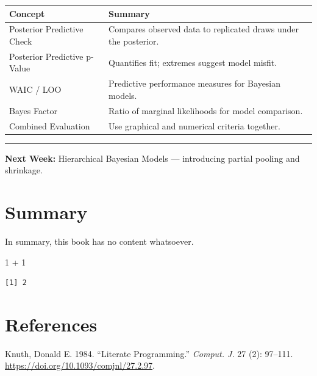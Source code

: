 \documentclass[
  letterpaper,
  DIV=11,
  numbers=noendperiod]{scrreprt}
\newenvironment{Shaded}{\begin{snugshade}}{\end{snugshade}}
\newcommand{\DecValTok}[1]{\textcolor[rgb]{0.68,0.00,0.00}{#1}}
\newcommand{\SpecialCharTok}[1]{\textcolor[rgb]{0.37,0.37,0.37}{#1}}
\newlength{\cslhangindent}
\newenvironment{CSLReferences}[2] %
 {\begin{list}{}{%
  \setlength{\itemindent}{0pt}
  \setlength{\leftmargin}{0pt}
  \setlength{\parsep}{0pt}
  \ifodd #1
   \setlength{\leftmargin}{\cslhangindent}
   \setlength{\itemindent}{-1\cslhangindent}
  \fi
  \setlength{\itemsep}{#2\baselineskip}}}
 {\end{list}}
\begin{document}
\begin{longtable}[]{@{}
  >{\raggedright\arraybackslash}p{}
  >{\raggedright\arraybackslash}p{}@{}}
\toprule\noalign{}
\begin{minipage}[b]{\linewidth}\raggedright
Concept
\end{minipage} & \begin{minipage}[b]{\linewidth}\raggedright
Summary
\end{minipage} \\
\midrule\noalign{}
\endhead
\bottomrule\noalign{}
\endlastfoot
Posterior Predictive Check & Compares observed data to replicated draws
under the posterior. \\
Posterior Predictive p-Value & Quantifies fit; extremes suggest model
misfit. \\
WAIC / LOO & Predictive performance measures for Bayesian models. \\
Bayes Factor & Ratio of marginal likelihoods for model comparison. \\
Combined Evaluation & Use graphical and numerical criteria together. \\
\end{longtable}

\begin{center}\rule{0.5\linewidth}{0.5pt}\end{center}

\textbf{Next Week:} Hierarchical Bayesian Models --- introducing partial
pooling and shrinkage.


\chapter{Summary}\label{summary}

In summary, this book has no content whatsoever.

\begin{Shaded}
\begin{Highlighting}[]
\DecValTok{1} \SpecialCharTok{+} \DecValTok{1}
\end{Highlighting}
\end{Shaded}

\begin{verbatim}
[1] 2
\end{verbatim}


\chapter*{References}\label{references}


\label{refs}
\begin{CSLReferences}{1}{0}
Knuth, Donald E. 1984. {``Literate Programming.''} \emph{Comput. J.} 27
(2): 97--111. \url{https://doi.org/10.1093/comjnl/27.2.97}.

\end{CSLReferences}
\end{document}
